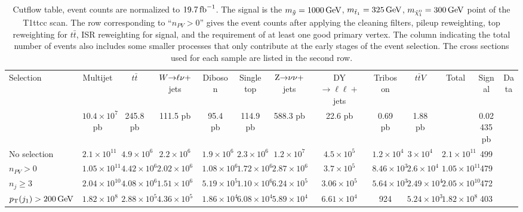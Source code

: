 \begin{sidewaystable}[p]
\centering
\caption{Cutflow table, event counts are normalized to $19.7\mbox{\ensuremath{\,\text{fb}^\text{$-$1}}}$. The signal is the
$m_{\tilde{g}}=1000\,\text{Ge\hspace{-.08em}V}$, $m_{\tilde{t}_1}=325\,\text{Ge\hspace{-.08em}V}$, $m_{\tilde{\chi}_1^0}=300\,\text{Ge\hspace{-.08em}V}$ point of the
T1ttcc scan. The row corresponding to ``$n_{PV} > 0$'' gives the event counts after applying the
cleaning filters, pileup reweighting, top \pt reweighting for $t\bar{t}$, ISR reweighting for
signal, and the requirement of at least one good primary vertex. The column indicating the total
number of events also includes some smaller processes that only contribute at the early stages of
the event selection. 
The cross sections used for each sample are listed in the second row.}
\vspace{1ex}
{\scriptsize
\begin{tabular}{ l | c  c  c  c  c  c  c  c  c | c  c  c }
\toprule
Selection & Multijet & $t\bar{t}$ & $W{\rightarrow}\ell\nu+$jets & Diboson & Single top &
$\mathrm{Z}{\rightarrow}\nu\nu+$jets & DY${\rightarrow}\ell\ell+$jets & Triboson & $t\bar{t}V$ & Total &
Signal & Data\\ 
 & $10.4\times 10^7$ pb & 245.8 pb & 111.5 pb & 95.4 pb & 114.9 pb & 588.3 pb & 22.6 pb & 0.69 pb &
1.88 pb & & 0.02435 pb & \\ 
 \midrule
No selection & $2.1\times 10^{11}$ & $4.9\times 10^6$ & $2.2\times 10^6$ & $1.9\times 10^6$ & $2.3\times 10^6$ & $1.2\times 10^7$ & $4.5\times 10^5$ & $1.2\times 10^4$ & $3\times 10^4$ & $2.1\times 10^{11}$ & 499 &  \\
$n_{PV} > 0$ & $1.05\times 10^{11}$ & $4.42\times 10^6$ & $2.02\times 10^6$ & $1.08\times 10^6$ & $1.72\times 10^6$ & $2.87\times 10^6$ & $3.7\times 10^5$ & $8.46\times 10^3$ & $2.6\times 10^4$ & $1.05\times 10^{11}$ & 479 & \\
$n_j \geq 3$ & $2.04\times 10^{10}$ & $4.08\times 10^6$ & $1.51\times 10^6$ & $5.19\times 10^5$ & $1.10\times 10^6$ & $6.24\times 10^5$ & $3.06\times 10^5$ & $5.64\times 10^3$ & $2.49\times 10^4$ & $2.05\times 10^{10}$ & 472 &  \\
$p_{\mathrm{T}}(j_1) > 200\,\text{Ge\hspace{-.08em}V}$ & $1.82\times 10^8$ & $2.88\times 10^5$ & $4.36\times 10^5$ & $1.86\times 10^4$ & $6.08\times 10^4$ & $5.89\times 10^4$ & $6.61\times 10^4$ & 924 & $5.24\times 10^3$  & $1.82\times 10^8$ & 403 & \\

\end{tabular}}
\end{sidewaystable}
